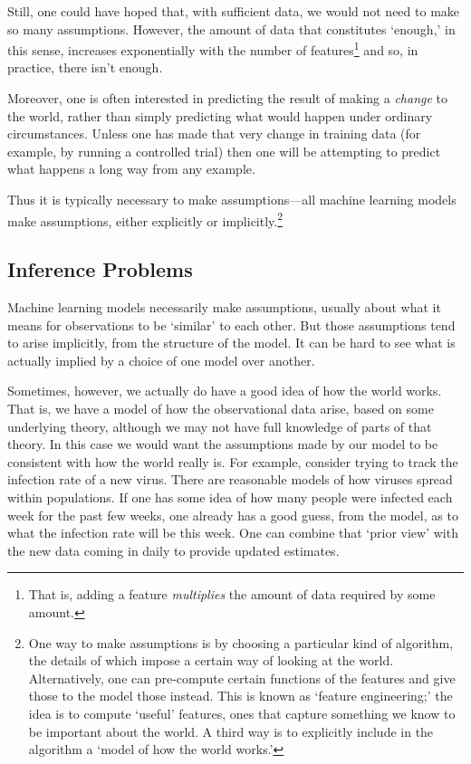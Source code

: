 \documentclass[10pt, a4, twocolumn]{article}
\begin{document}
Still, one could have hoped that, with sufficient data, we would not need to
make so many assumptions. However, the amount of data that constitutes `enough,'
in this sense, increases exponentially with the number of features\footnote{That
is, adding a feature \emph{multiplies} the amount of data required by some
amount.} and so, in practice, there isn't enough.

Moreover, one is often interested in predicting the result of making a
\emph{change} to the world, rather than simply predicting what would happen
under ordinary circumstances. Unless one has made that very change in training
data (for example, by running a controlled trial) then one will be attempting to
predict what happens a long way from any example.

Thus it is typically necessary to make assumptions---all machine learning models
make assumptions, either explicitly or implicitly.\footnote{One way to make
assumptions is by choosing a particular kind of algorithm, the details of which
impose a certain way of looking at the world. Alternatively, one can pre-compute
certain functions of the features and give those to the model those
instead. This is known as `feature engineering;' the idea is to compute `useful'
features, ones that capture something we know to be important about the world. A
third way is to explicitly include in the algorithm a `model of how the world
works.'}

\subsection{Inference Problems}

Machine learning models necessarily make assumptions, usually about what it
means for observations to be `similar' to each other. But those assumptions tend
to arise implicitly, from the structure of the model. It can be hard to see what
is actually implied by a choice of one model over another.

Sometimes, however, we actually do have a good idea of how the world works. That
is, we have a model of how the observational data arise, based on some
underlying theory, although we may not have full knowledge of parts of that
theory. In this case we would want the assumptions made by our model to be
consistent with how the world really is. For example, consider trying to track
the infection rate of a new virus. There are reasonable models of how viruses
spread within populations. If one has some idea of how many people were infected
each week for the past few weeks, one already has a good guess, from the model,
as to what the infection rate will be this week. One can combine that `prior
view' with the new data coming in daily to provide updated estimates.
\end{document}
